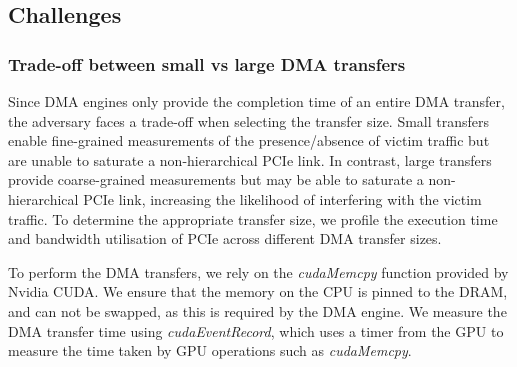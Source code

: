 \subsection{Challenges}
\label{subsec:interconnect-sc-dma-challenges}

\subsubsection{Trade-off between small vs large DMA transfers}
\label{subsubsec:interconnect-sc-dma-challenges-trade-off-small-v-large-tx}

Since DMA engines only provide the completion time of an entire DMA transfer, the adversary faces a trade-off when selecting the transfer size. 
Small transfers enable fine-grained measurements of the presence/absence of victim traffic but are unable to saturate a non-hierarchical PCIe link. 
In contrast, large transfers provide coarse-grained measurements but may be able to saturate a non-hierarchical PCIe link, increasing the likelihood of interfering with the victim traffic.
To determine the appropriate transfer size, we profile the execution time and bandwidth utilisation of PCIe across different DMA transfer sizes.

To perform the DMA transfers, we rely on the \textit{cudaMemcpy} function provided by Nvidia CUDA.
We ensure that the memory on the CPU is pinned to the DRAM, and can not be swapped, as this is required by the DMA engine.
We measure the DMA transfer time using \textit{cudaEventRecord}, which uses a timer from the GPU to measure the time taken by GPU operations such as \textit{cudaMemcpy}.



